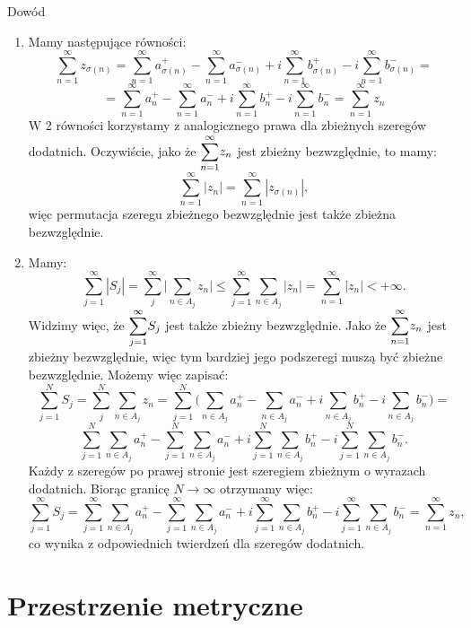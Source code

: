 \documentclass{article}
\newcommand{\oo}{\infty}
\begin{document}
    \begin{dow}{Dowód}
        \begin{enumerate}
            \item Mamy następujące równości:
            \[\sum_{n=1}^{\oo} z_{\sigma(n)} =  \sum_{n=1}^{\oo} a_{\sigma(n)}^+ - \sum_{n=1}^{\oo} a_{\sigma(n)}^- + i\sum_{n=1}^{\oo} b_{\sigma(n)}^+ -i\sum_{n=1}^{\oo}b_{\sigma(n)}^- =\]
            \[= \sum_{n=1}^{\oo} a_n^+ - \sum_{n=1}^{\oo} a_n^- + i\sum_{n=1}^{\oo} b_n^+ -i\sum_{n=1}^{\oo}b_n^- = \sum_{n=1}^{\oo} z_n\]
            W 2 równości korzystamy z analogicznego prawa dla zbieżnych szeregów dodatnich.
            Oczywiście, jako że $\mathlarger{\sum}_{n=1}^{\oo} z_n$ jest zbieżny bezwzględnie, to mamy:
            \[\sum_{n=1}^{\oo} |z_n| = \sum_{n=1}^{\oo} |z_{\sigma(n)}|,\]
            więc permutacja szeregu zbieżnego bezwzględnie jest także zbieżna bezwzględnie.

            \item Mamy:
            \[\sum_{j=1}^{\oo} |S_j| = \sum_j^{\oo} \Big| \sum_{n \in A_j} z_n \Big| \leqslant \sum_{j=1}^{\oo} \sum_{n \in A_j} |z_n| =\sum_{n=1}^{\oo} |z_n| < + \oo. \]
            Widzimy więc, że $\mathlarger{\sum}_{j=1}^{\oo} S_j$ jest także zbieżny bezwzględnie.
            Jako że $\mathlarger{\sum}_{n=1}^{\oo} z_n$ jest zbieżny bezwzględnie, więc tym bardziej jego podszeregi muszą być zbieżne bezwzględnie. Możemy więc zapisać:
            \[\sum_{j=1}^{N} S_j = \sum_j^{N} \sum_{n \in A_j} z_n = \sum_{j=1}^N \Big(\sum_{n \in A_j} a_n^+ - \sum_{n \in A_j} a_n^- + i\sum_{n \in A_j} b_n^+ -i\sum_{n \in A_j} b_n^- \Big) =\]
            \[\sum_{j=1}^N\sum_{n \in A_j} a_n^+ - \sum_{j=1}^N\sum_{n \in A_j} a_n^- + i\sum_{j=1}^N\sum_{n \in A_j} b_n^+ -i\sum_{j=1}^N\sum_{n \in A_j} b_n^-.\]
            Każdy z szeregów po prawej stronie jest szeregiem zbieżnym o wyrazach dodatnich. Biorąc granicę $N \to \oo$ otrzymamy więc:
            \[\sum_{j=1}^{\oo} S_j = \sum_{j=1}^\oo\sum_{n \in A_j} a_n^+ - \sum_{j=1}^\oo\sum_{n \in A_j} a_n^- + i\sum_{j=1}^\oo\sum_{n \in A_j} b_n^+ -i\sum_{j=1}^\oo\sum_{n \in A_j} b_n^- = \sum_{n=1}^\oo z_n,\]
            co wynika z odpowiednich twierdzeń dla szeregów dodatnich.
            \end{enumerate}
    \end{dow}

\section{Przestrzenie metryczne}
\end{document}
